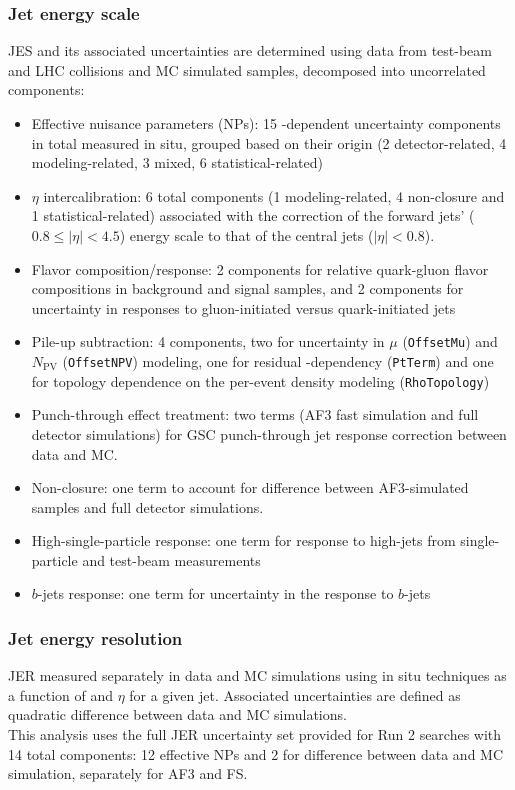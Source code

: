 \documentclass[../thesis.tex]{subfiles}
\begin{document}
\subsubsection*{Jet energy scale}
JES and its associated uncertainties are determined using data from test-beam and LHC collisions and MC simulated samples, decomposed into uncorrelated components:
\begin{itemize}
\item Effective nuisance parameters (NPs): 15 \pT-dependent uncertainty components in total measured in situ, grouped based on their origin (2 detector-related, 4 modeling-related, 3 mixed, 6 statistical-related)
\item $\eta$ intercalibration: 6 total components (1 modeling-related, 4 non-closure and 1 statistical-related) associated with the correction of the forward jets' ($0.8\leq |\eta| < 4.5$) energy scale to that of the central jets ($|\eta| < 0.8$).
\item Flavor composition/response: 2 components for relative quark-gluon flavor compositions in background and signal samples, and 2 components for uncertainty in responses to gluon-initiated versus quark-initiated jets
\item Pile-up subtraction: 4 components, two for uncertainty in $\mu$ (\verb|OffsetMu|) and $N_\mathrm{PV}$ (\verb|OffsetNPV|) modeling, one for residual \pT-dependency (\verb|PtTerm|) and one for topology dependence on the per-event \pT density modeling (\verb|RhoTopology|)
\item Punch-through effect treatment: two terms (AF3 fast simulation and full detector simulations) for GSC punch-through jet response correction between data and MC.
\item Non-closure: one term to account for difference between AF3-simulated samples and full detector simulations.
\item High-\pT single-particle response: one term for response to high-\pT jets from single-particle and test-beam measurements
\item $b$-jets response: one term for uncertainty in the response to $b$-jets
\end{itemize}
\subsubsection*{Jet energy resolution}
JER measured separately in data and MC simulations using in situ techniques as a function of \pT and $\eta$ for a given jet. 
Associated uncertainties are defined as quadratic difference between data and MC simulations.\\
This analysis uses the full JER uncertainty set provided for Run 2 searches with 14 total components: 12 effective NPs and 2 for difference between data and MC simulation, separately for AF3 and FS.
\end{document}
